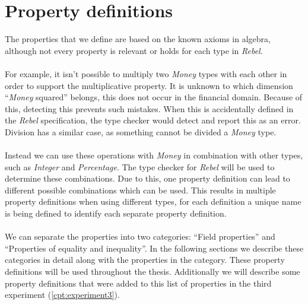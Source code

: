 \section{Property definitions}
\label{sct:properties_property_definitions}
The properties that we define are based on the known axioms in algebra, although
not every property is relevant or holds for each type in \textit{Rebel}.\\
\\
For example, it isn't possible to multiply two
\textit{Money} types with each other in order to support the multiplicative
property. It is unknown to which dimension ``\textit{Money} squared'' belongs,
this does not occur in the financial domain. Because of this, detecting this
prevents such mistakes. When this is accidentally defined in the \textit{Rebel}
specification, the type checker would detect and report this as an error.
Division has a similar case, as something cannot be divided a \textit{Money}
type.\\
\\
Instead we can use these operations with \textit{Money} in combination with
other types, such as \textit{Integer} and \textit{Percentage}. The type checker
for \textit{Rebel} will be used to determine these combinations. Due to this,
one property definition can lead to different possible combinations which can be
used. This results in multiple property definitions when using different types,
for each definition a unique name is being defined to identify each separate
property definition.\\
\\
We can separate the properties into two categories: ``Field properties'' and
``Properties of equality and inequality''. In the following sections we describe
these categories in detail along with the properties in the category. These
property definitions will be used throughout the thesis. Additionally we will
describe some property definitions that were added to this list of properties in
the third experiment (\autoref{cpt:experiment3}).

